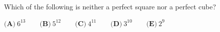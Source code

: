Which of the following is neither a perfect square nor a perfect cube?

$\textbf{(A)}\ 6^{13}\qquad\textbf{(B)}\ 5^{12}\qquad\textbf{(C)}\ 4^{11}\qquad\textbf{(D)}\ 3^{10}\qquad\textbf{(E)}\ 2^{9}$
